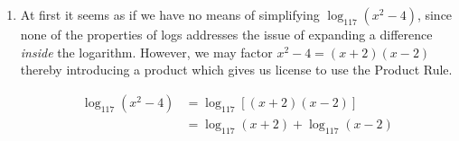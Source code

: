 {\begin{enumerate}

\begin{align*}
\log \sqrt[3]{\dfrac{100 x^2}{yz^5}} & =  \log \left(\dfrac{100 x^2}{yz^5}\right)^{1/3}  \\ 
& =  \frac{1}{3} \log\left(\dfrac{100 x^2}{yz^5}\right)  \tag*{Power Rule} \\ 
& =  \frac{1}{3} \left[ \log\left(100x^2\right) - \log\left(yz^5\right) \right]  \tag*{Quotient Rule} \\ 
& = \frac{1}{3}\log\left(100x^2\right) - \frac{1}{3}\log\left(yz^5\right) \\
& =  \frac{1}{3}\left[ \log(100) + \log\left(x^2\right)\right] - \frac{1}{3} \left[ \log(y) + \log\left(z^5\right) \right]  \tag*{Product Rule} \\
& = \frac{1}{3} \log(100) + \frac{1}{3} \log\left(x^2\right) - \frac{1}{3} \log(y) - \frac{1}{3} \log\left(z^5\right) \\
& =  \frac{1}{3} \log(100) + \frac{2}{3} \log(x) - \frac{1}{3} \log(y) - \frac{5}{3} \log(z)  \tag*{Power Rule} \\
& =  \frac{2}{3} + \frac{2}{3} \log(x) - \frac{1}{3} \log(y) - \frac{5}{3} \log(z)  \tag*{Since $10^2=100$} \\
& =   \frac{2}{3} \log(x) - \frac{1}{3} \log(y) - \frac{5}{3} \log(z) + \frac{2}{3} 
\end{align*}

\item  At first it seems as if we have no means of simplifying $\log_{117}\left(x^2-4\right)$, since none of the properties of logs addresses the issue of expanding a difference \textit{inside} the logarithm.  However, we may factor $x^2 - 4 = (x+2)(x-2)$ thereby introducing a product which gives us license to use the Product Rule.

\begin{align*}
\log_{117}\left(x^2-4\right) & =  \log_{117} \left[(x+2)(x-2)\right]  \tag*{Factor} \\
 & =  \log_{117}(x+2) + \log_{117}(x-2)  \tag*{Product Rule} 
\end{align*}

\end{enumerate}
}

\medskip

